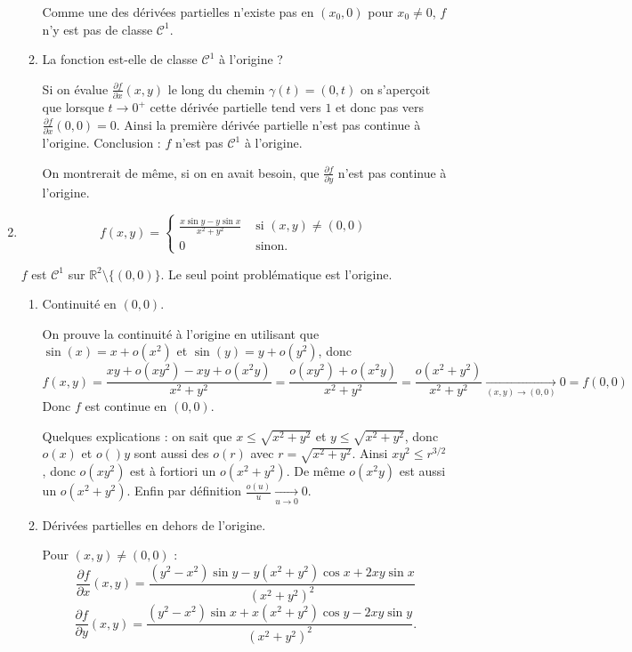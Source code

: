 \documentclass[11pt,a4paper]{article}
\newcommand{\Rr}{\mathbb{R}} \newcommand{\R}{\mathbb{R}}
\renewcommand{\le}{\leqslant} \renewcommand{\leq}{\leqslant}
\theoremstyle{exostyle}
\begin{document}
\begin{enumerate}
\begin{enumerate}
		Comme une des dérivées partielles n'existe pas en $(x_0,0)$ pour $x_0\neq0$, $f$ n'y est pas de classe $\mathcal{C}^1$.

		
		\item La fonction est-elle de classe $\mathcal{C}^1$ à l'origine ?
		
		Si on évalue $\frac{\partial f}{\partial x}(x, y)$ le long du chemin $\gamma(t) = (0,t)$ on s'aperçoit que lorsque $t \to 0^+$ cette dérivée partielle tend vers $1$ et donc pas vers $\frac{\partial f}{\partial x}(0,0) = 0$.
		Ainsi la première dérivée partielle n'est pas continue à l'origine.
		Conclusion : $f$ n'est pas $\mathcal{C}^1$ à l'origine.
		
		On montrerait de même, si on en avait besoin, que $\frac{\partial f}{\partial y}$ n'est pas continue à l'origine.
 		
 		
	\end{enumerate}
	    
	
	\item $$
	f(x,y)=\left\{
	\begin{array}{cc}
		\frac{x\sin y - y\sin x}{x^2+y^2} & \mbox{ si }(x,y) \neq (0,0) \\
		0 & \mbox{ sinon. }
	\end{array}
	\right .
	$$
	
	$f$ est $\mathcal{C}^1$ sur $\Rr^2 \setminus \{(0,0)\}$. Le seul point problématique est l'origine. 
	
		\begin{enumerate}
		\item Continuité en $(0,0)$.
		
		On prouve la continuité à l'origine en utilisant que $\sin(x) = x + o(x^2)$ et
		$\sin(y) = y + o(y^2)$,
		donc 
		\[
		f(x,y) = \frac{xy +o(xy^2) - xy + o(x^2y)}{x^2+y^2}
		= \frac{o(xy^2) +o(x^2y)}{x^2+y^2} 
		= \frac{o(x^2+y^2)}{x^2+y^2}\xrightarrow[(x,y)\to (0,0)]{} 0 = f(0,0)
		\]
		Donc $f$ est continue en $(0,0)$.
		
		Quelques explications : on sait que $x \le \sqrt{x^2+y^2}$ et $y \le \sqrt{x^2+y^2}$, donc $o(x)$ et $o()y$ sont aussi des $o(r)$ avec $r=\sqrt{x^2+y^2}$.
		Ainsi $xy^2 \le r^{3/2}$, donc $o(xy^2)$ est à fortiori un $o(x^2+y^2)$. De même $o(x^2y)$ est aussi un $o(x^2+y^2)$.
		Enfin par définition $\frac{o(u)}{u} \xrightarrow[u \to 0]{} 0$. 

		
		\item Dérivées partielles en dehors de l'origine.
		
		Pour \((x, y) \neq (0, 0)\) :
		\[
		\frac{\partial f}{\partial x}(x, y) = \frac{(y^2-x^2)\sin y  - y(x^2+y^2)\cos x + 2xy\sin x}{(x^2 + y^2)^2}
		\]
		\[
		\frac{\partial f}{\partial y}(x, y) = \frac{(y^2-x^2)\sin x  + x(x^2+y^2)\cos y - 2xy\sin y}{(x^2 + y^2)^2}.
		\]


\end{enumerate}
\end{enumerate}
\end{document}
